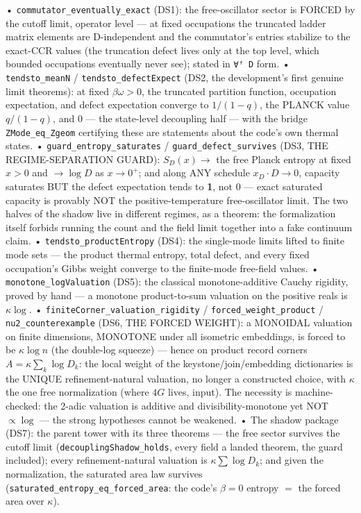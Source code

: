 \documentclass[11pt,a4paper]{article}
\begin{document}
  • \texttt{commutator\_eventually\_exact} (DS1): the free-oscillator sector is FORCED by the cutoff limit, operator level — at fixed occupations the truncated ladder matrix elements are D-independent and the commutator's entries stabilize to the exact-CCR values (the truncation defect lives only at the top level, which bounded occupations eventually never see); stated in \texttt{∀ᶠ D} form.
  • \texttt{tendsto\_meanN} / \texttt{tendsto\_defectExpect} (DS2, the development's first genuine limit theorems): at fixed $βω > 0$, the truncated partition function, occupation expectation, and defect expectation converge to $1/(1-q)$, the PLANCK value $q/(1-q)$, and $0$ — the state-level decoupling half — with the bridge \texttt{ZMode\_eq\_Zgeom} certifying these are statements about the code's own thermal states.
  • \texttt{guard\_entropy\_saturates} / \texttt{guard\_defect\_survives} (DS3, THE REGIME-SEPARATION GUARD): $S_D(x) \to$ the free Planck entropy at fixed $x > 0$ and $\to \log D$ as $x \to 0^+$; and along ANY schedule $x_D·D \to 0$, capacity saturates BUT the defect expectation tends to \textbf{1}, not 0 — exact saturated capacity is provably NOT the positive-temperature free-oscillator limit. The two halves of the shadow live in different regimes, as a theorem: the formalization itself forbids running the count and the field limit together into a fake continuum claim.
  • \texttt{tendsto\_productEntropy} (DS4): the single-mode limits lifted to finite mode sets — the product thermal entropy, total defect, and every fixed occupation's Gibbs weight converge to the finite-mode free-field values.
  • \texttt{monotone\_logValuation} (DS5): the classical monotone-additive Cauchy rigidity, proved by hand — a monotone product-to-sum valuation on the positive reals is $κ\log$.
  • \texttt{finiteCorner\_valuation\_rigidity} / \texttt{forced\_weight\_product} / \texttt{nu2\_counterexample} (DS6, THE FORCED WEIGHT): a MONOIDAL valuation on finite dimensions, MONOTONE under all isometric embeddings, is forced to be $κ\log n$ (the double-log squeeze) — hence on product record corners $A = κ\sum_k \log D_k$: the local weight of the keystone/join/embedding dictionaries is the UNIQUE refinement-natural valuation, no longer a constructed choice, with $κ$ the one free normalization (where $4G$ lives, input). The necessity is machine-checked: the 2-adic valuation is additive and divisibility-monotone yet NOT $\propto \log$ — the strong hypotheses cannot be weakened.
  • The shadow package (DS7): the parent tower with its three theorems — the free sector survives the cutoff limit (\texttt{decouplingShadow\_holds}, every field a landed theorem, the guard included); every refinement-natural valuation is $κ\sum \log D_k$; and given the normalization, the saturated area law survives (\texttt{saturated\_entropy\_eq\_forced\_area}: the code's $β = 0$ entropy $=$ the forced area over $κ$).
\end{document}
